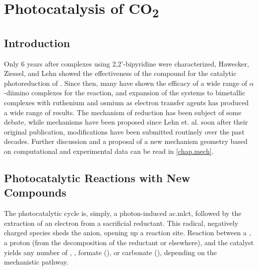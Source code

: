 \chapter{Photocatalysis of \texorpdfstring{CO\textsubscript{2}}{CO2}}

\section{Introduction}

Only 6 years after  complexes using 2,2'-bipyridine were characterized, Hawecker, Ziessel, and Lehn showed the effectiveness of the compound for the catalytic photoreduction of \autocite{hawecker1983}. Since then, many have shown the efficacy of a wide range of $\alpha$-diimino complexes for the reaction, and expansion of the systems to bimetallic complexes with ruthenium and osmium as electron transfer agents has produced a wide range of results. The mechanism of reduction has been subject of some debate, while mechanisms have been proposed since Lehn et. al. soon after their original publication\autocite{hawecker1986}, modifications have been submitted routinely over the past decades. Further discussion and a proposal of a new mechanism geometry based on computational and experimental data can be read in \autoref{chap.mech}.

\section{Photocatalytic Reactions with New Compounds}

The photocatalytic cycle is, simply, a photon-induced \gls{ac.mlct}, followed by the extraction of an electron from a sacrificial reductant. This radical, negatively charged species sheds the anion, opening up a reaction site. Reaction between a , a proton (from the decomposition of the reductant or elsewhere), and the catalyst yields any number of , , formate (), or carbonate (), depending on the mechanistic pathway. 

